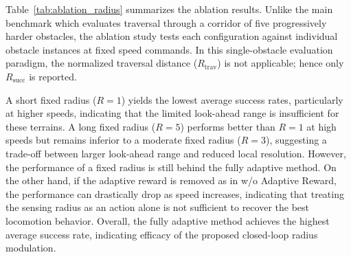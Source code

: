 Table~\ref{tab:ablation_radius} summarizes the ablation results. Unlike the main benchmark which evaluates traversal through a corridor of five progressively harder obstacles, the ablation study tests each configuration against individual obstacle instances at fixed speed commands. In this single-obstacle evaluation paradigm, the normalized traversal distance ($R_{\mathrm{trav}}$) is not applicable; hence only $R_{\mathrm{succ}}$ is reported.

A short fixed radius ($R=1$) yields the lowest average success rates, particularly at higher speeds, indicating that the limited look-ahead range is insufficient for these terrains. 
A long fixed radius ($R=5$) performs better than $R=1$ at high speeds but remains inferior to a moderate fixed radius ($R=3$), suggesting a trade-off between larger look-ahead range and reduced local resolution. However, the performance of a fixed radius is still behind the fully adaptive method. On the other hand, if the adaptive reward is removed as in w/o Adaptive Reward, the performance can drastically drop as speed increases, indicating that treating the sensing radius as an action alone is not sufficient to recover the best locomotion behavior.
Overall, the fully adaptive method achieves the highest average success rate, indicating efficacy of the proposed closed-loop radius modulation.

